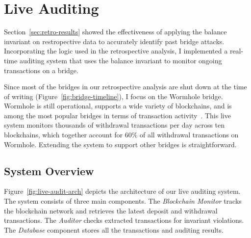 \section{Live Auditing}
\label{sec:live-audit}

Section~\ref{sec:retro-results} showed the effectiveness of applying
the balance invariant on restropective data to accurately identify
past bridge attacks.  Incorporating the logic used in the
retrospective analysis, I implemented a real-time auditing system
that uses the balance invariant to monitor ongoing transactions on a
bridge.

Since most of the bridges in our retrospective analysis are shut down at
the time of writing (Figure~\ref{fig:bridge-timeline}), I focus on the
Wormhole bridge.  Wormhole is still operational, supports a wide
variety of blockchains, and is among the most popular bridges in terms
of transaction activity~\cite{zhang2023sok}.  This live system
monitors thousands of withdrawal transactions per day across ten
blockchains, which together account for 60\% of all withdrawal
transactions on Wormhole.  Extending the system to support other
bridges is straightforward.




\subsection{System Overview}

Figure~\ref{fig:live-audit-arch} depicts the architecture of our live
auditing system. The system consists of three main components. The
\textit{Blockchain Monitor} tracks the blockchain network and
retrieves the latest deposit and withdrawal transactions. The
\textit{Auditor} checks extracted transactions for invariant
violations. The \textit{Database} component stores all the
transactions and auditing results.


